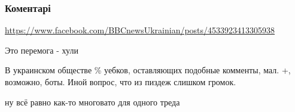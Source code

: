  
 
 
 
 
\subsubsection{Коментарі}

\begin{itemize}
 
\url{https://www.facebook.com/BBCnewsUkrainian/posts/4533923413305938}

 
Это перемога - хули

 
В украинском обществе \% уебков, оставляющих подобные комменты, мал. +, возможно, боты. Иной вопрос, что из пиздеж слишком громок.

\begin{itemize}
 
ну всё равно как-то многовато для одного треда

 

\end{itemize}
\end{itemize}

